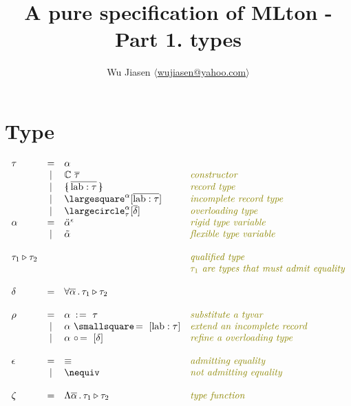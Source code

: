 \documentclass[11pt,a4paper]{article}
\newcommand{\nbkey}[1]{\textrm{#1}}
\newcommand{\record}[1]{\{\!\!\shortmid #1 \shortmid\!\!\}}
\newcommand{\overld}[3]{\largecircle^{#1}_{#2}{#3}}
\newcommand{\irecrd}[2]{\largesquare^{#1}{#2}}
\newcommand{\tyvarsubst}[2]{#1\ \hspace{-0.2ex}:\hspace{1pt}=\ #2}
\newcommand{\ovldrefine}[2]{#1\ \circ\hspace{-0.3ex}=\ #2}
\newcommand{\irecextend}[2]{#1\ \smallsquare\hspace{-0.3ex}=\ #2}
\newcommand{\lab}{\nbkey{lab}}
\newcommand{\rigdvar}[1]{\ddot{#1}}
\newcommand{\flexvar}[1]{\tilde#1}
\newcommand{\comment}[1]{\textit{\color{olive}#1}}
\newcommand{\tycon}{\mathbb{C}}
\newcommand{\tyfun}{\zeta}
\newcommand{\type}{\tau}
\newcommand{\qualtype}[2]{#1 \triangleright #2}
\newcommand{\scheme}{\delta}
\newcommand{\substitute}{\rho}
\newcommand{\equality}{\epsilon}
\newcommand{\eqyes}{\equiv}
\newcommand{\eqnot}{\nequiv}
\begin{document}
\title {A pure specification of MLton - Part 1. types}
\author{Wu Jiasen $\langle$\href{mailto:wujiasen@yahoo.com}{wujiasen@yahoo.com}$\rangle$}
\maketitle 
\thispagestyle{fancy}

\section{Type}
{\renewcommand{\arraystretch}{1.2}\[
\begin{array}{lcll}
\type
     & = & \alpha                                           & \\
     & | & \tycon\ \overline\type              	            &\comment{constructor}\\
     & | & \record{\overline{\lab:\type}}       		    &\comment{record type}\\
     & | & \irecrd{\alpha}{[\overline{\lab:\type}]}         &\comment{incomplete record type}\\
     & | & \overld{\alpha}{\type}{[\overline\scheme]}     	&\comment{overloading type}\\
\alpha 
     & = & \rigdvar{\alpha}^{\equality}                     &\comment{rigid type variable}\\
     & | & \flexvar{\alpha}                                 &\comment{flexible type variable}\\     
\\
\qualtype{\type_1}{\type_2} & &                             &\comment{qualified type} \\
                            & &                             &\comment{$\type_1$ are types that must admit equality} \\
\\     
\scheme 
     & = & \forall \overline{\alpha}\,.\,\qualtype{\type_1}{\type_2}
                                                            &\\
\\
\substitute
     & = & \tyvarsubst{\alpha}{\type}                   	&\comment{substitute a tyvar}\\
     & | & \irecextend{\alpha}{[\lab:\type]}	     	    &\comment{extend an incomplete record}\\
     & | & \ovldrefine{\alpha}{[\scheme]}               	&\comment{refine a overloading type}\\
\\     
\equality
	& = & \eqyes	& \comment{admitting equality}     \\
	& | & \eqnot	& \comment{not admitting equality} \\
\\
\tyfun
     & = & \Lambda{\overline{\alpha}}\,.\,{\qualtype{\type_1}{\type_2}} 
                                                            &\comment{type function}\\
\end{array}
\]}
\end{document}
